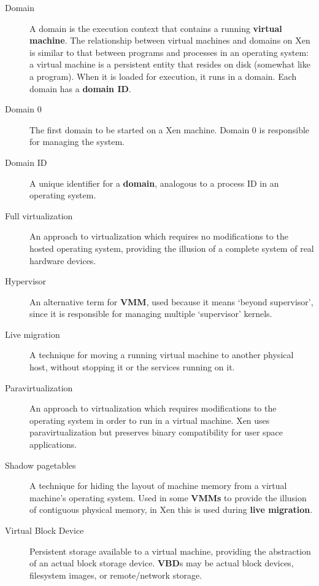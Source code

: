 \documentclass[11pt,twoside,final,openright]{report}
\begin{document}
\begin{description}

\item[Domain] A domain is the execution context that contains a
  running {\bf virtual machine}.  The relationship between virtual
  machines and domains on Xen is similar to that between programs and
  processes in an operating system: a virtual machine is a persistent
  entity that resides on disk (somewhat like a program).  When it is
  loaded for execution, it runs in a domain.  Each domain has a {\bf
    domain ID}.

\item[Domain 0] The first domain to be started on a Xen machine.
  Domain 0 is responsible for managing the system.

\item[Domain ID] A unique identifier for a {\bf domain}, analogous to
  a process ID in an operating system.

\item[Full virtualization] An approach to virtualization which
  requires no modifications to the hosted operating system, providing
  the illusion of a complete system of real hardware devices.

\item[Hypervisor] An alternative term for {\bf VMM}, used because it
  means `beyond supervisor', since it is responsible for managing
  multiple `supervisor' kernels.

\item[Live migration] A technique for moving a running virtual machine
  to another physical host, without stopping it or the services
  running on it.

\item[Paravirtualization] An approach to virtualization which requires
  modifications to the operating system in order to run in a virtual
  machine.  Xen uses paravirtualization but preserves binary
  compatibility for user space applications.

\item[Shadow pagetables] A technique for hiding the layout of machine
  memory from a virtual machine's operating system.  Used in some {\bf
  VMMs} to provide the illusion of contiguous physical memory, in
  Xen this is used during {\bf live migration}.

\item[Virtual Block Device] Persistent storage available to a virtual
  machine, providing the abstraction of an actual block storage device.
  {\bf VBD}s may be actual block devices, filesystem images, or
  remote/network storage.


\end{description}
\end{document}
